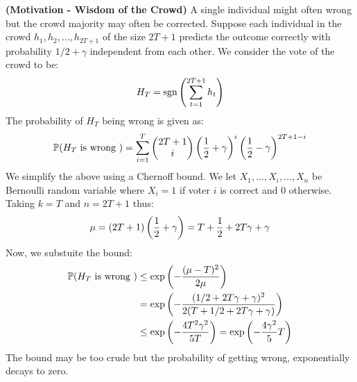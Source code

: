 \begin{remark}{\textbf{(Motivation - Wisdom of the Crowd)}}
    A single individual might often wrong but the crowd majority may often be corrected. Suppose each individual in the crowd $h_1,h_2,\dots,h_{2T+1}$ of the size $2T+1$ predicts the outcome correctly with probability $1/2+\gamma$ independent from each other. We consider the vote of the crowd to be:
    \begin{equation*}
        H_T = \operatorname{sgn}\left( \sum^{2T+1}_{t=1}h_t \right)
    \end{equation*}
    The probability of $H_T$ being wrong is given as:
    \begin{equation*}
        \mathbb{P}(H_T \text{ is wrong }) = \sum^T_{i=1}\begin{pmatrix}
            2T+1 \\ i
        \end{pmatrix}\left( \frac{1}{2}+\gamma \right)^i\left( \frac{1}{2}-\gamma \right)^{2T+1-i}
    \end{equation*}
    We simplify the above using a Chernoff bound. We let $X_1,\dots,X_i,\dots,X_n$ be Bernoulli random variable where $X_i = 1$ if voter $i$ is correct and $0$ otherwise. Taking $k = T$ and $n=2T+1$ thus:
    \begin{equation*}
        \mu = (2T+1)\left( \frac{1}{2} + \gamma \right) = T + \frac{1}{2}+2T\gamma + \gamma
    \end{equation*}
    Now, we substuite the bound:
    \begin{equation*}
    \begin{aligned}
        \mathbb{P}(H_T \text{ is wrong }) &\le \exp\left( -\frac{(\mu - T)^2}{2\mu} \right) \\
        &= \exp\left( -\frac{(1/2+2T\gamma + \gamma)^2}{2(T+1/2+2T\gamma + \gamma)} \right) \\
        &\le \exp\left( -\frac{4T^2\gamma^2}{5T} \right) = \exp\left( -\frac{4\gamma^2}{5}T \right)
    \end{aligned}
    \end{equation*}
    The bound may be too crude but the probability of getting wrong, exponentially decays to zero. 
\end{remark}

